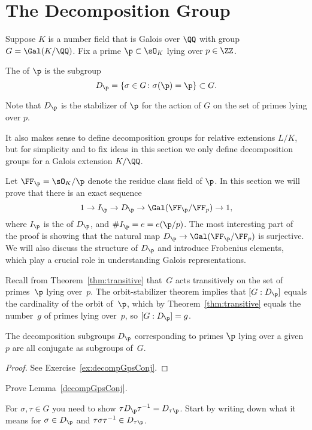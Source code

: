 \section{The Decomposition Group}

Suppose $K$ is a number field that is Galois over $\QQ$ with
group $G = \Gal(K/\QQ)$. Fix a prime $\p \subset \sO_K$ lying over $p \in \ZZ$.
\begin{definition}\label{def:decomp}
  The  of $\p$ is the subgroup
  \[
    D_\p = \{\sigma \in G \colon \sigma(\p) = \p\} \subset G.
  \]
\end{definition}
Note that $D_\p$ is the stabilizer of $\p$ for
the action of $G$ on the set of primes lying over $p$.

It also makes sense to define decomposition groups for relative
extensions $L/K$, but for simplicity and to fix ideas in this section
we only define decomposition groups for a Galois extension $K/\QQ$.

Let $\FF_{\p} = \sO_K/\p$ denote the residue class field of $\p$.
In this section we will prove that there is an exact sequence
\[
  1\to I_\p \to D_\p \to \Gal(\FF_{\p}/\FF_p)\to 1,
\]
where $I_\p$ is the  of $D_\p$, and $\#I_\p=e = e(\p/p)$.
The most interesting part of the proof is showing that the natural
map $D_\p\to  \Gal(\FF_{\p}/\FF_p)$ is surjective.
We will also discuss the structure of $D_\p$ and introduce
Frobenius elements, which play a crucial role in understanding Galois
representations.


Recall from Theorem~\ref{thm:transitive} that~$G$ acts transitively
on the set of primes~$\p$ lying over~$p$.
The orbit-stabilizer theorem implies that $[G:D_\p]$ equals the
cardinality of the orbit of~$\p$, which by Theorem~\ref{thm:transitive}
equals the number~$g$ of primes lying over~$p$, so $[G:D_\p]=g$.

\begin{lemma}\label{decompGpsConj}
  The decomposition subgroups $D_\p$ corresponding to primes $\p$
  lying over a given $p$ are all conjugate as subgroups of~$G$.
\end{lemma}
\begin{proof}
  See Exercise~\ref{ex:decompGpsConj}.
\end{proof}

\begin{exercise}\label{ex:decompGpsConj}
  Prove Lemma~\ref{decompGpsConj}.

  \begin{hint}
    For $\sigma,\tau\in G$ you need to show
    $\tau D_\p \tau^{-1} = D_{\tau\p}$.
    Start by writing down what it means for $\sigma\in D_\p$
    and $\tau\sigma\tau^{-1}\in D_{\tau\p}$.
  \end{hint}
\end{exercise}

